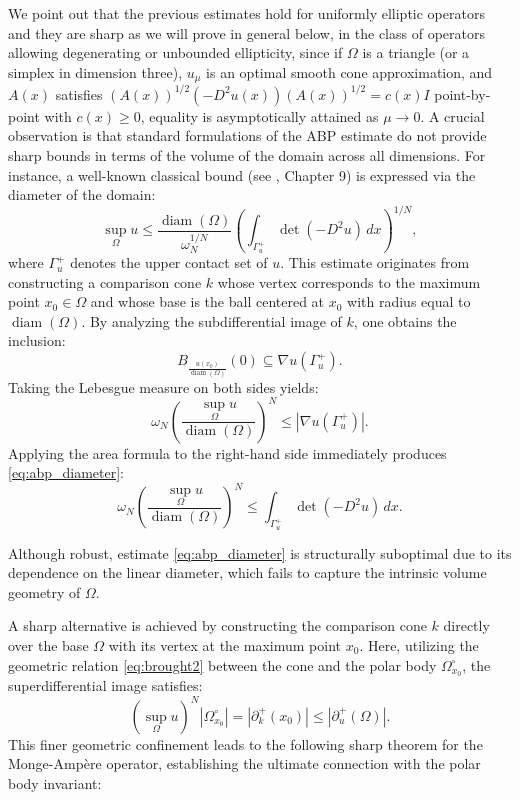 \documentclass{article}
\numberwithin{equation}{section}
\begin{document}
\noindent We point out that the previous estimates hold for uniformly elliptic operators and they are sharp as we will prove in general below, in the class of operators allowing degenerating or unbounded ellipticity, since if $\Omega$ is a triangle (or a simplex in dimension three), $u_\mu$ is an optimal smooth cone approximation, and $A(x)$ satisfies $(A(x))^{1/2}(-D^2u(x))(A(x))^{1/2} = c(x)I$ point-by-point with $c(x) \ge 0$, equality is asymptotically attained as $\mu \rightarrow 0$. A crucial observation is that standard formulations of the ABP estimate do not provide sharp bounds in terms of the volume of the domain across all dimensions. For instance, a well-known classical bound (see \cite{gilbarg2001}, Chapter 9) is expressed via the diameter of the domain:
\begin{equation}\label{eq:abp_diameter}
\sup_\Omega u \le \frac{\operatorname{diam}(\Omega)}{\omega_N^{1/N}} \left( \int_{\Gamma_u^+} \det(-D^2u) \, dx \right)^{1/N},
\end{equation}
where $\Gamma_u^+$ denotes the upper contact set of $u$. This estimate originates from constructing a comparison cone $k$ whose vertex corresponds to the maximum point $x_0 \in \Omega$ and whose base is the ball centered at $x_0$ with radius equal to $\operatorname{diam}(\Omega)$. By analyzing the subdifferential image of $k$, one obtains the inclusion:
\[
B_{\frac{u(x_0)}{\operatorname{diam}(\Omega)}}(0) \subseteq \nabla u(\Gamma_u^+).
\]
Taking the Lebesgue measure on both sides yields:
\[
\omega_N \left( \frac{\sup_\Omega u}{\operatorname{diam}(\Omega)} \right)^N \le |\nabla u(\Gamma_u^+)|.
\]
Applying the area formula to the right-hand side immediately produces \eqref{eq:abp_diameter}:
\[
\omega_N \left( \frac{\sup_\Omega u}{\operatorname{diam}(\Omega)} \right)^N \le \int_{\Gamma_u^+} \det(-D^2u) \, dx.
\] 

\noindent Although robust, estimate \eqref{eq:abp_diameter} is structurally suboptimal due to its dependence on the linear diameter, which fails to capture the intrinsic volume geometry of $\Omega$. 

\noindent A sharp alternative is achieved by constructing the comparison cone $k$ directly over the base $\Omega$ with its vertex at the maximum point $x_0$. Here, utilizing the geometric relation \eqref{eq:brought2} between the cone and the polar body $\Omega_{x_0}^\circ$, the superdifferential image satisfies:
\[
(\sup_\Omega u)^N |\Omega_{x_0}^\circ| = |\partial^+_k(x_0)| \le |\partial^+_u(\Omega)|.
\]
This finer geometric confinement leads to the following sharp theorem for the Monge-Ampère operator, establishing the ultimate connection with the polar body invariant:
\end{document}
